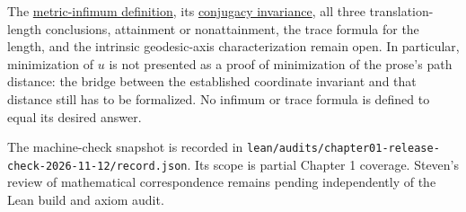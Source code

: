 The \hyperref[hyperbolic.translation-length]{metric-infimum definition}, its \hyperref[hyperbolic.translation-length-conjugacy]{conjugacy invariance}, all three translation-length conclusions, attainment or nonattainment, the trace formula for the length, and the intrinsic geodesic-axis characterization remain open. In particular, minimization of $u$ is not presented as a proof of minimization of the prose's path distance: the bridge between the established coordinate invariant and that distance still has to be formalized. No infimum or trace formula is defined to equal its desired answer.

The machine-check snapshot is recorded in \texttt{lean/audits/chapter01-release-check-2026-11-12/record.json}. Its scope is partial Chapter 1 coverage. Steven's review of mathematical correspondence remains pending independently of the Lean build and axiom audit.
